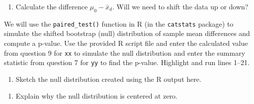 \documentclass[
]{report}
\newenvironment{Shaded}{\begin{snugshade}}{\end{snugshade}}
\newcommand{\AttributeTok}[1]{\textcolor[rgb]{0.77,0.63,0.00}{#1}}
\newcommand{\CommentTok}[1]{\textcolor[rgb]{0.56,0.35,0.01}{\textit{#1}}}
\newcommand{\DecValTok}[1]{\textcolor[rgb]{0.00,0.00,0.81}{#1}}
\newcommand{\FunctionTok}[1]{\textcolor[rgb]{0.00,0.00,0.00}{#1}}
\newcommand{\NormalTok}[1]{#1}
\newcommand{\SpecialCharTok}[1]{\textcolor[rgb]{0.00,0.00,0.00}{#1}}
\newcommand{\StringTok}[1]{\textcolor[rgb]{0.31,0.60,0.02}{#1}}
\providecommand{\tightlist}{%
  \setlength{\itemsep}{0pt}\setlength{\parskip}{0pt}}
\begin{document}
\begin{enumerate}
\def\labelenumi{\arabic{enumi}.}
\setcounter{enumi}{8}
\tightlist
\item
  Calculate the difference \(\mu_0 - \bar{x}_d\). Will we need to shift the data up or down?
\end{enumerate}

\vspace{.7in}

We will use the \texttt{paired\_test()} function in R (in the \texttt{catstats} package) to simulate the shifted bootstrap (null) distribution of sample mean differences and compute a p-value. Use the provided R script file and enter the calculated value from question 9 for \texttt{xx} to simulate the null distribution and enter the summary statistic from question 7 for \texttt{yy} to find the p-value. Highlight and run lines 1--21.

\begin{Shaded}
\end{Shaded}

\begin{enumerate}
\def\labelenumi{\arabic{enumi}.}
\setcounter{enumi}{9}
\tightlist
\item
  Sketch the null distribution created using the R output here.
\end{enumerate}

\vspace{1.8in}

\begin{enumerate}
\def\labelenumi{\arabic{enumi}.}
\setcounter{enumi}{10}
\tightlist
\item
  Explain why the null distribution is centered at zero.
\end{enumerate}
\end{document}
